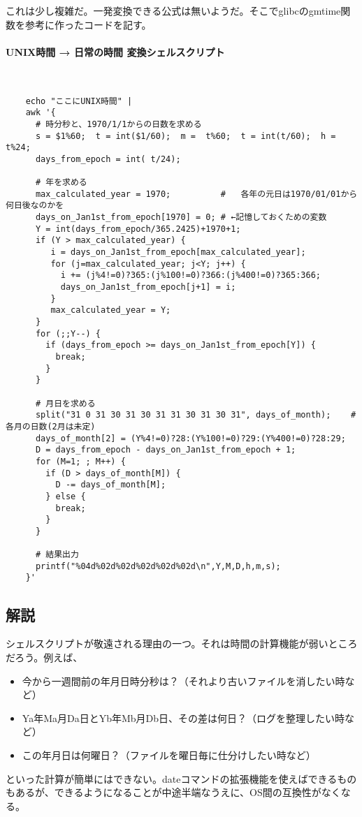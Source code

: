 これは少し複雑だ。一発変換できる公式は無いようだ。そこでglibcのgmtime関数を参考に作ったコードを記す。
\paragraph{UNIX時間 → 日常の時間 変換シェルスクリプト}　\\
\begin{frameboxit}{160.0mm}
\begin{verbatim}
	echo "ここにUNIX時間" |
	awk '{
	  # 時分秒と、1970/1/1からの日数を求める
	  s = $1%60;  t = int($1/60);  m =  t%60;  t = int(t/60);  h = t%24;
	  days_from_epoch = int( t/24);

	  # 年を求める
	  max_calculated_year = 1970;          #   各年の元日は1970/01/01から何日後なのかを
	  days_on_Jan1st_from_epoch[1970] = 0; # ←記憶しておくための変数
	  Y = int(days_from_epoch/365.2425)+1970+1;
	  if (Y > max_calculated_year) {
	     i = days_on_Jan1st_from_epoch[max_calculated_year];
	     for (j=max_calculated_year; j<Y; j++) {
	       i += (j%4!=0)?365:(j%100!=0)?366:(j%400!=0)?365:366;
	       days_on_Jan1st_from_epoch[j+1] = i;
	     }
	     max_calculated_year = Y;
	  }
	  for (;;Y--) {
	    if (days_from_epoch >= days_on_Jan1st_from_epoch[Y]) {
	      break;
	    }
	  }

	  # 月日を求める
	  split("31 0 31 30 31 30 31 31 30 31 30 31", days_of_month);    # 各月の日数(2月は未定)
	  days_of_month[2] = (Y%4!=0)?28:(Y%100!=0)?29:(Y%400!=0)?28:29;
	  D = days_from_epoch - days_on_Jan1st_from_epoch + 1;
	  for (M=1; ; M++) {
	    if (D > days_of_month[M]) {
	      D -= days_of_month[M];
	    } else {
	      break;
	    }
	  }

	  # 結果出力
	  printf("%04d%02d%02d%02d%02d%02d\n",Y,M,D,h,m,s);
	}'
\end{verbatim}
\end{frameboxit}

\subsection*{解説}

シェルスクリプトが敬遠される理由の一つ。それは時間の計算機能が弱いところだろう。例えば、
\begin{itemize}
  \item 今から一週間前の年月日時分秒は？（それより古いファイルを消したい時など）
  \item Ya年Ma月Da日とYb年Mb月Db日、その差は何日？（ログを整理したい時など）
  \item この年月日は何曜日？（ファイルを曜日毎に仕分けしたい時など）
\end{itemize}
といった計算が簡単にはできない。dateコマンドの拡張機能を使えばできるものもあるが、できるようになることが中途半端なうえに、OS間の互換性がなくなる。

